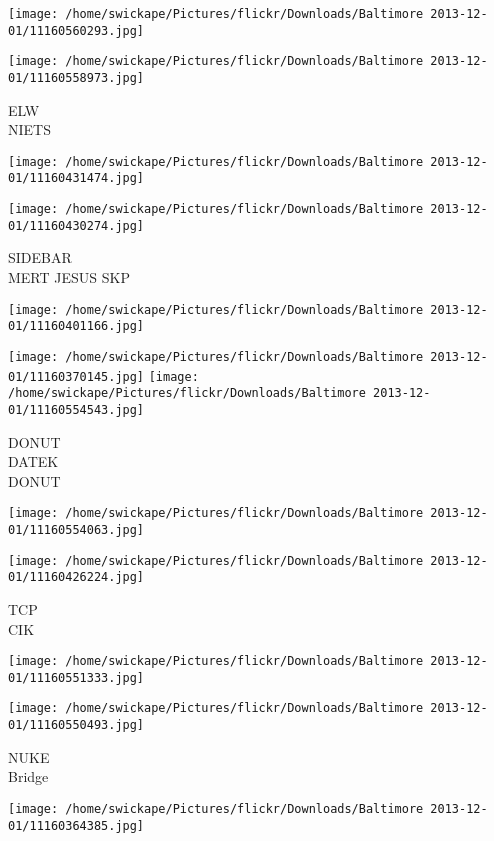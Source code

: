 \documentclass[10pt,letterpaper]{article}
\begin{document}
\texttt{[image: /home/swickape/Pictures/flickr/Downloads/Baltimore 2013-12-01/11160560293.jpg]}

\vspace{0.25in}
\texttt{[image: /home/swickape/Pictures/flickr/Downloads/Baltimore 2013-12-01/11160558973.jpg]}

ELW\\
NIETS
\pagebreak

\texttt{[image: /home/swickape/Pictures/flickr/Downloads/Baltimore 2013-12-01/11160431474.jpg]}

\vspace{0.25in}
\texttt{[image: /home/swickape/Pictures/flickr/Downloads/Baltimore 2013-12-01/11160430274.jpg]}

SIDEBAR\\
MERT JESUS SKP
\pagebreak

\texttt{[image: /home/swickape/Pictures/flickr/Downloads/Baltimore 2013-12-01/11160401166.jpg]}

\vspace{0.25in}
\texttt{[image: /home/swickape/Pictures/flickr/Downloads/Baltimore 2013-12-01/11160370145.jpg]}
\texttt{[image: /home/swickape/Pictures/flickr/Downloads/Baltimore 2013-12-01/11160554543.jpg]}

DONUT\\
DATEK\\
DONUT
\pagebreak

\texttt{[image: /home/swickape/Pictures/flickr/Downloads/Baltimore 2013-12-01/11160554063.jpg]}

\vspace{0.25in}
\texttt{[image: /home/swickape/Pictures/flickr/Downloads/Baltimore 2013-12-01/11160426224.jpg]}

TCP\\
CIK
\pagebreak

\texttt{[image: /home/swickape/Pictures/flickr/Downloads/Baltimore 2013-12-01/11160551333.jpg]}

\vspace{0.25in}
\texttt{[image: /home/swickape/Pictures/flickr/Downloads/Baltimore 2013-12-01/11160550493.jpg]}

NUKE\\
Bridge
\pagebreak

\texttt{[image: /home/swickape/Pictures/flickr/Downloads/Baltimore 2013-12-01/11160364385.jpg]}
\end{document}
